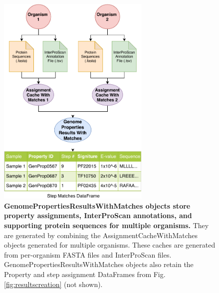 \begin{figure}[!ht]
  \centering
	\includegraphics[width=0.65\textwidth]{media/assignment_results_with_matches_overview.pdf}
	 \caption[GenomePropertiesResultsWithMatches objects store property assignments, InterProScan annotations, and supporting protein sequences for multiple organisms.]{\textbf{GenomePropertiesResultsWithMatches objects store property assignments, InterProScan annotations, and supporting protein sequences for multiple organisms.} They are generated by combining the AssignmentCacheWithMatches objects generated for multiple organisms. These caches are generated from per-organism FASTA files and InterProScan files. GenomePropertiesResultsWithMatches objects also retain the Property and step assignment DataFrames from Fig. \ref{fig:resultscreation} (not shown).}
	 \label{fig:resultswithmatchescreation}
\end{figure} 

